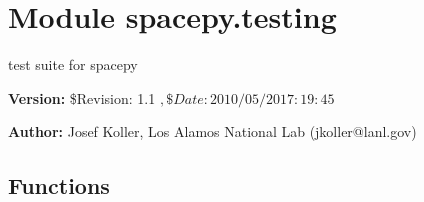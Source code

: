 %
%
%


\section{Module spacepy.testing}

    \label{spacepy:testing}
test suite for spacepy

\textbf{Version:} \$Revision: 1.1 $, \$Date: 2010/05/20 17:19:45 $



\textbf{Author:} Josef Koller, Los Alamos National Lab (jkoller@lanl.gov)





  \subsection{Functions}

    \label{spacepy:testing:all}

    \vspace{0.5ex}

